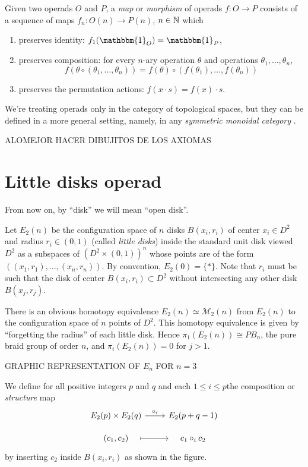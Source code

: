 \documentclass[TFM.tex]{subfiles}
\begin{document}

\begin{defi}
Given two operads $O$ and $P$, a \emph{map} or \emph{morphism} of operads $f:O\to P$ consists of a sequence of maps $f_n:O(n)\to P(n)$, $n\in\mathbb{N}$ which
\begin{enumerate}
\item preserves identity: $f_1(\mathbbm{1}_O)=\mathbbm{1}_P$,
\item preserves composition: for every $n$-ary operation $\theta$ and operations $\theta_1,\dots, \theta_n$,
\[
f(\theta\circ(\theta_1,\ldots,\theta_n))
= f(\theta)\circ(f(\theta_1),\ldots,f(\theta_n))
\]
\item  preserves the permutation actions: $f(x\cdot s)=f(x)\cdot s$.
\end{enumerate}
\end{defi}

We're treating operads only in the category of topological spaces, but they can be defined in a more general setting, namely, in any \emph{symmetric monoidal category} \cite{Yau}.

ALOMEJOR HACER DIBUJITOS DE LOS AXIOMAS


\section{Little disks operad}

From now on, by ``disk'' we will mean ``open disk''. 
 
 Let $E_2(n)$ be the configuration space of $n$ disks $B(x_i,r_i)$ of center $x_i\in D^2$ and radius $r_i\in (0,1)$ (called \emph{little disks}) inside the standard unit disk viewed $D^2$ as a subspaces of $(D^2\times (0,1))^n$ whose points are of the form $((x_1,r_1),\dots, (x_n,r_n))$. By convention, $E_2(0)=\{*\}$. Note that $r_i$ must be such that the disk of center $B(x_i,r_i)\subset D^2$ without intersecting any other disk $B(x_j,r_j)$. 
 
 There is an obvious homotopy equivalence $E_2(n)\simeq \mathcal{M}_2(n)$ from $E_2(n)$ to the configuration space of $n$ points of $D^2$. This homotopy equivalence is given by ``forgetting the radius'' of each little disk. Hence $\pi_1(E_2(n))\cong PB_n$, the pure braid group of order $n$, and $\pi_i(E_2(n))=0$ for $j>1$. 
 
 
 GRAPHIC REPRESENTATION OF $E_n$ FOR $n=3$
 
 We define for all positive integers $p$ and $q$ and  each $1\leq i\leq p$the composition or \emph{structure} map 
 \[
 \begin{tikzcd}[row sep=10]
  E_2(p)\times E_2(q)\arrow[r, "\circ_i"] & E_2(p+q-1)\\
  (c_1,c_2)\arrow[r, mapsto, shorten <= 1em, shorten >= 1em] & c_1\circ_i c_2
 \end{tikzcd}
 \]
 by inserting $c_2$ inside $B(x_i,r_i)$ as shown in the figure. 
 
\end{document}
